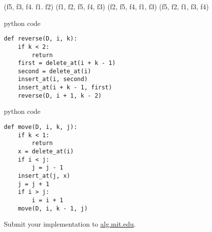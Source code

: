 \documentclass[12pt,twoside]{article}
\begin{document}


\begin{problems}

\problem  %

\begin{problemparts}
\problempart %
(f5, f3, f4. f1. f2)
\problempart %
(f1, f2, f5, f4, f3)
\problempart %
 ({f2, f5}, f4, f1, f3)
\problempart %
(f5, f2, f1, f3, f4)
\end{problemparts}

\newpage
\problem  %

\begin{problemparts}
\problempart %
python code

\begin{lstlisting}
def reverse(D, i, k):
    if k < 2:
        return
    first = delete_at(i + k - 1)
    second = delete_at(i)
    insert_at(i, second)
    insert_at(i + k - 1, first)
    reverse(D, i + 1, k - 2)
\end{lstlisting}

\problempart %
python code

\begin{lstlisting}
def move(D, i, k, j):
    if k < 1:
        return
    x = delete_at(i)
    if i < j:
        j = j - 1
    insert_at(j, x)
    j = j + 1
    if i > j:
        i = i + 1
    move(D, i, k - 1, j)
\end{lstlisting}
\end{problemparts}

\newpage
\problem  %

\newpage
\problem  %

\begin{problemparts}
\problempart %
\problempart %
\problempart %
\problempart Submit your implementation to {\small\url{alg.mit.edu}}.
\end{problemparts}

\end{problems}
\end{document}
